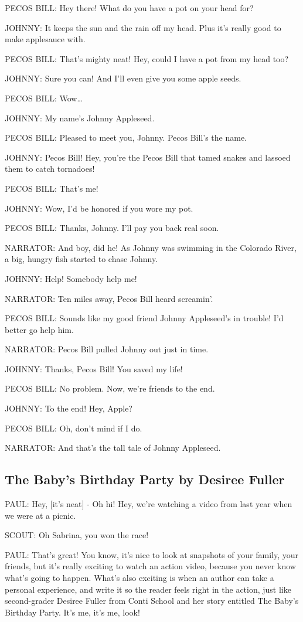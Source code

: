 PECOS BILL:
Hey there!
What do you have a pot on your head for?

JOHNNY:
It keeps the sun and the rain off my head.
Plus it's really good to make applesauce with.

PECOS BILL:
That's mighty neat!
Hey, could I have a pot from my head too?

JOHNNY:
Sure you can!
And I'll even give you some apple seeds.

PECOS BILL:
Wow\dots

JOHNNY:
My name's Johnny Appleseed.

PECOS BILL:
Pleased to meet you, Johnny.
Pecos Bill's the name.

JOHNNY:
Pecos Bill!
Hey, you're the Pecos Bill that tamed snakes and lassoed them to catch tornadoes!

PECOS BILL:
That's me!

JOHNNY:
Wow, I'd be honored if you wore my pot.

PECOS BILL:
Thanks, Johnny.
I'll pay you back real soon.

NARRATOR:
And boy, did he!
As Johnny was swimming in the Colorado River, a big, hungry fish started to chase Johnny.

JOHNNY:
Help!
Somebody help me!

NARRATOR:
Ten miles away, Pecos Bill heard screamin'.

PECOS BILL:
Sounds like my good friend Johnny Appleseed's in trouble!
I'd better go help him.

NARRATOR:
Pecos Bill pulled Johnny out just in time.

JOHNNY:
Thanks, Pecos Bill!
You saved my life!

PECOS BILL:
No problem.
Now, we're friends to the end.

JOHNNY:
To the end!
Hey, Apple?

PECOS BILL:
Oh, don't mind if I do.

NARRATOR:
And that's the tall tale of Johnny Appleseed.

\subsection{The Baby's Birthday Party by Desiree Fuller}

PAUL:
Hey, [it's neat] -
Oh hi!
Hey, we're watching a video from last year when we were at a picnic.

SCOUT:
Oh Sabrina, you won the race!

PAUL:
That's great!
You know, it's nice to look at snapshots of your family, your friends, but it's really exciting to watch an action video, because you never know what's going to happen.
What's also exciting is when an author can take a personal experience, and write it so the reader feels right in the action, just like second-grader Desiree Fuller from Conti School and her story entitled The Baby's Birthday Party.
It's me, it's me, look!

